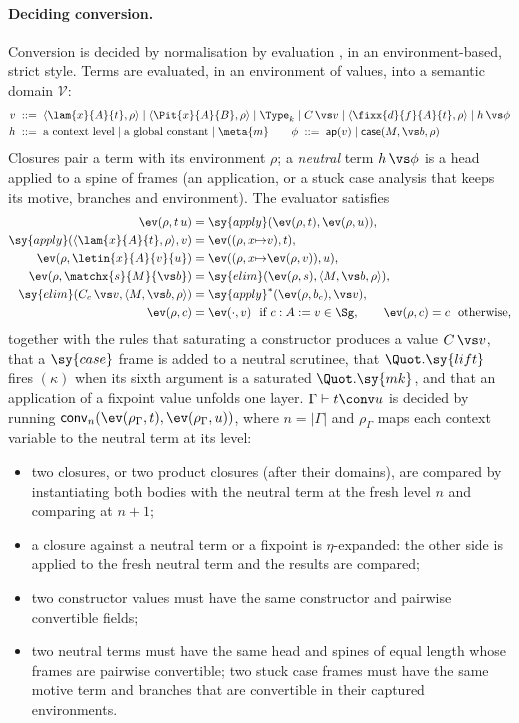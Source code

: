 \paragraph{Deciding conversion.}
Conversion is decided by normalisation by evaluation \citep{berger91,gregoire02,abel18}, in an environment-based, strict style.
Terms are evaluated, in an environment of values, into a semantic domain $\mathcal V$:
\begin{align*}
v \;::=\;\; & \langle\lam{x}{A}{t},\rho\rangle \mid \langle\Pit{x}{A}{B},\rho\rangle \mid \Type_k \mid C\,\vs v \mid \langle\fixx{d}{f}{A}{t},\rho\rangle \mid h\,\vs\phi\\
h \;::=\;\; & \text{a context level} \mid \text{a global constant} \mid \meta{m}
\qquad
\phi \;::=\; \mathsf{ap}(v) \mid \mathsf{case}(M,\vs b,\rho)
\end{align*}
Closures pair a term with its environment $\rho$; a \emph{neutral} term $h\,\vs\phi$ is a head applied to a spine of frames (an application, or a stuck case analysis that keeps its motive, branches and environment).
The evaluator satisfies
\begin{align*}
\ev(\rho, t\,u) &= \sy{apply}(\ev(\rho,t),\ev(\rho,u)),\\
\sy{apply}(\langle\lam{x}{A}{t},\rho\rangle, v) &= \ev((\rho,x{\mapsto}v),t),\\
\ev(\rho,\letin{x}{A}{v}{u}) &= \ev((\rho,x{\mapsto}\ev(\rho,v)),u),\\
\ev(\rho,\matchx{s}{M}{\vs b}) &= \sy{elim}(\ev(\rho,s),\langle M,\vs b,\rho\rangle),\\
\sy{elim}(C_c\,\vs v,\langle M,\vs b,\rho\rangle) &= \sy{apply}^*(\ev(\rho,b_c),\vs v),\\
\ev(\rho,c) &= \ev(\cdot,v)\ \text{ if } c:A\mathrel{:=}v\in\Sg,\qquad \ev(\rho,c)=c\ \text{ otherwise,}
\end{align*}
together with the rules that saturating a constructor produces a value $C\,\vs v$, that a $\sy{case}$ frame is added to a neutral scrutinee, that $\Quot.\sy{lift}$ fires $(\kappa)$ when its sixth argument is a saturated $\Quot.\sy{mk}$, and that an application of a fixpoint value unfolds one layer.
$\Gamma\vdash t\conv u$ is decided by running $\mathsf{conv}_n(\ev(\rho_\Gamma,t),\ev(\rho_\Gamma,u))$, where $n=|\Gamma|$ and $\rho_\Gamma$ maps each context variable to the neutral term at its level:
\begin{itemize}
\item two closures, or two product closures (after their domains), are compared by instantiating both bodies with the neutral term at the fresh level $n$ and comparing at $n+1$;
\item a closure against a neutral term or a fixpoint is $\eta$-expanded: the other side is applied to the fresh neutral term and the results are compared;
\item two constructor values must have the same constructor and pairwise convertible fields;
\item two neutral terms must have the same head and spines of equal length whose frames are pairwise convertible; two stuck case frames must have the same motive term and branches that are convertible in their captured environments.
\end{itemize}
